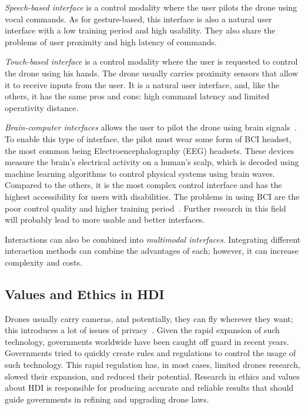 \textit{Speech-based interface} is a control modality where the user pilots the drone using vocal commands. 
As for gesture-based, this interface is also a natural user interface with a low training period and high usability.
They also share the problems of user proximity and high latency of commands.  

\textit{Touch-based interface} is a control modality where the user is requested to control the drone using his hands. 
The drone usually carries proximity sensors that allow it to receive inputs from the user. 
It is a natural user interface, and, like the others, it has the same pros and cons: high command latency and limited operativity distance.

\textit{Brain-computer interfaces} allows the user to pilot the drone using brain signals~\cite{lafleur2013quadcopterBCI}.
To enable this type of interface, the pilot must wear some form of BCI headset, the most common being 
Electroencephalography (EEG) headsets. These devices measure the brain's electrical activity on a human's scalp, 
which is decoded using machine learning algorithms to control physical systems using brain waves. 
Compared to the others, it is the most complex control interface and has the highest accessibility for users with disabilities. 
The problems in using BCI are the poor control quality and higher training period~\cite{kawala2021summary}. 
Further research in this field will probably lead to more usable and better interfaces.

Interactions can also be combined into \textit{multimodal interfaces}. 
Integrating different interaction methods can combine the advantages of each; however, it can increase complexity and costs.

\subsection{Values and Ethics in HDI}\label{subsec:hdi_ethics}
Drones usually carry cameras, and potentially, they can fly wherever they want; this introduces a lot of issues of privacy~\cite{anderson2012accidentally}.
Given the rapid expansion of such technology, governments worldwide have been caught off guard in recent years. 
Governments tried to quickly create rules and regulations to control the usage of such technology. 
This rapid regulation has, in most cases, limited drones research, slowed their expansion, and reduced their potential.
Research in ethics and values about HDI is responsible for producing accurate and reliable results that should guide 
governments in refining and upgrading drone laws.

